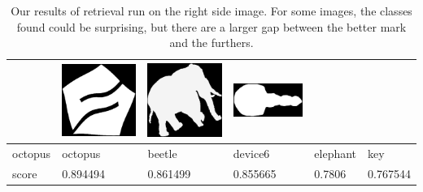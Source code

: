 \begin{table}[h!]
\begin{tabular}{ | m{2.2cm} | m{2.2cm} | m{2.2cm} | m{2.2cm} | m{2.2cm} | m{2.2cm} | }
\begin{minipage}{.3\textwidth}
    \end{minipage}
	&
	\begin{minipage}{.3\textwidth}
      \includegraphics[width=\linewidth, width=20mm]{images/device6-exp2}
    \end{minipage}
	&
    \begin{minipage}{.3\textwidth}
      \includegraphics[width=\linewidth, width=20mm]{images/elephant}
    \end{minipage}
	&
    \begin{minipage}{.3\textwidth}
      \includegraphics[width=\linewidth, width=20mm]{images/key}
    \end{minipage}
	\\ \hline
	octopus & octopus & beetle & device6 & elephant & key \\ \hline
	score & 0.894494 & 0.861499 & 0.855665 & 0.7806 & 0.767544 \\ \hline
  \end{tabular}
  \caption{Our results of retrieval run on the right side image. For some images, the classes found could be surprising, but there are a larger gap between the better mark and the furthers.}
  \label{results}
\end{table}



